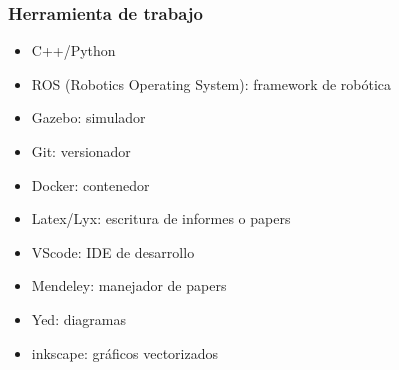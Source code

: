 \begin{frame}
    \frametitle{Herramienta de trabajo}

    \begin{itemize}
        \item C++/Python
        \item ROS (Robotics Operating System): framework de robótica
        \item Gazebo: simulador
        \item Git: versionador
        \item Docker: contenedor
        \item Latex/Lyx: escritura de informes o papers
        \item VScode: IDE de desarrollo
        \item Mendeley: manejador de papers
        \item Yed: diagramas
        \item inkscape: gráficos vectorizados
    \end{itemize}
\end{frame}